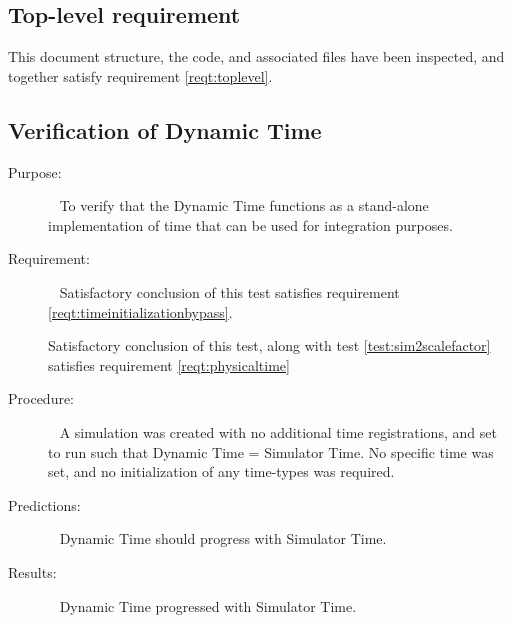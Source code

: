 %
%
% 
%


\subsection{Top-level requirement}

\label{inspect:TLI}
 This document structure, the code, and associated files have been inspected, 
 and together satisfy requirement \ref{reqt:toplevel}.
 
\subsection{Verification of Dynamic Time}
\label{test:1dynonly}
\begin{description}
\item[Purpose:]\ \newline
To verify that the Dynamic Time functions as a stand-alone implementation of 
time that can be used for integration purposes.

\item[Requirement:]\ \newline
Satisfactory conclusion of this test satisfies requirement 
\ref{reqt:timeinitializationbypass}.

Satisfactory conclusion of this test, along with test 
\ref{test:sim2scalefactor} satisfies requirement \ref{reqt:physicaltime}

\item[Procedure:]\ \newline
A simulation was created with no additional time registrations, and set to run 
such that Dynamic Time = Simulator Time.  No specific time was set, and no 
initialization of any time-types was required.

\item[Predictions:]\ \newline
Dynamic Time should progress with Simulator Time.

\item[Results:]\ \newline
Dynamic Time progressed with Simulator Time.
\end{description}
 
